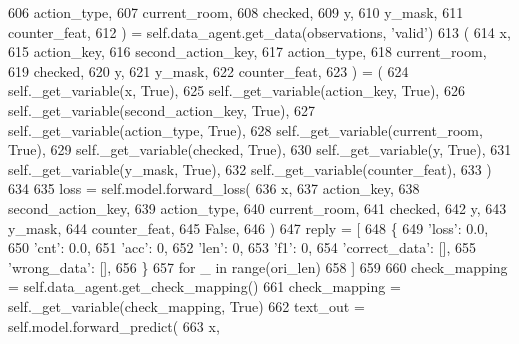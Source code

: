 \begin{DoxyCode}
606                 action\_type,
607                 current\_room,
608                 checked,
609                 y,
610                 y\_mask,
611                 counter\_feat,
612             ) = self.data\_agent.get\_data(observations, \textcolor{stringliteral}{'valid'})
613             (
614                 x,
615                 action\_key,
616                 second\_action\_key,
617                 action\_type,
618                 current\_room,
619                 checked,
620                 y,
621                 y\_mask,
622                 counter\_feat,
623             ) = (
624                 self.\_get\_variable(x, \textcolor{keyword}{True}),
625                 self.\_get\_variable(action\_key, \textcolor{keyword}{True}),
626                 self.\_get\_variable(second\_action\_key, \textcolor{keyword}{True}),
627                 self.\_get\_variable(action\_type, \textcolor{keyword}{True}),
628                 self.\_get\_variable(current\_room, \textcolor{keyword}{True}),
629                 self.\_get\_variable(checked, \textcolor{keyword}{True}),
630                 self.\_get\_variable(y, \textcolor{keyword}{True}),
631                 self.\_get\_variable(y\_mask, \textcolor{keyword}{True}),
632                 self.\_get\_variable(counter\_feat),
633             )
634 
635             loss = self.model.forward\_loss(
636                 x,
637                 action\_key,
638                 second\_action\_key,
639                 action\_type,
640                 current\_room,
641                 checked,
642                 y,
643                 y\_mask,
644                 counter\_feat,
645                 \textcolor{keyword}{False},
646             )
647             reply = [
648                 \{
649                     \textcolor{stringliteral}{'loss'}: 0.0,
650                     \textcolor{stringliteral}{'cnt'}: 0.0,
651                     \textcolor{stringliteral}{'acc'}: 0,
652                     \textcolor{stringliteral}{'len'}: 0,
653                     \textcolor{stringliteral}{'f1'}: 0,
654                     \textcolor{stringliteral}{'correct\_data'}: [],
655                     \textcolor{stringliteral}{'wrong\_data'}: [],
656                 \}
657                 \textcolor{keywordflow}{for} \_ \textcolor{keywordflow}{in} range(ori\_len)
658             ]
659 
660             check\_mapping = self.data\_agent.get\_check\_mapping()
661             check\_mapping = self.\_get\_variable(check\_mapping, \textcolor{keyword}{True})
662             text\_out = self.model.forward\_predict(
663                 x,

\end{DoxyCode}
